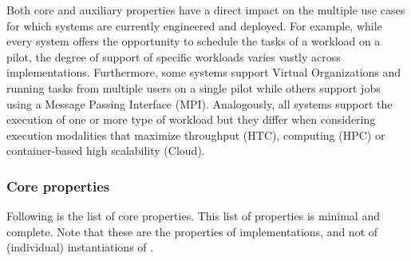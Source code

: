 \documentclass{sig-alternate}
\begin{document}
Both core and auxiliary properties have a direct impact on the multiple use
cases for which \pilot systems are currently engineered and deployed. For
example, while every \pilot system offers the opportunity to schedule the tasks
of a workload on a pilot, the degree of support of specific workloads varies
vastly across implementations. Furthermore, some \pilot systems support Virtual
Organizations and running tasks from multiple users on a single pilot while
others support jobs using a Message Passing Interface (MPI). Analogously, all
\pilot systems support the execution of one or more type of workload but they
differ when considering execution modalities that maximize throughput (HTC),
computing (HPC) or container-based high scalability (Cloud).

\subsubsection{Core properties}
\label{sec:coreprops}

Following is the list of core properties. This list of properties is minimal
and complete. Note that these are the properties of \pilot implementations, and
not of (individual) instantiations of \pilots.
\end{document}
